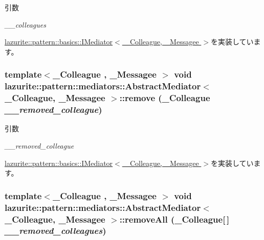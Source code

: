 \begin{DoxyParams}{引数}
\item[{\em \_\-\_\-colleagues}]\end{DoxyParams}


\hyperlink{interfacelazurite_1_1pattern_1_1basics_1_1_i_mediator_3_01___colleague_00_01___messagee_01_4_a60acf7d5d011dd442fc651b2bfb49081}{lazurite::pattern::basics::IMediator$<$ \_\-Colleague, \_\-Messagee $>$}を実装しています。\hypertarget{classlazurite_1_1pattern_1_1mediators_1_1_abstract_mediator_3_01___colleague_00_01___messagee_01_4_ab96e1fc164c5681a0ef3d950434c69e7}{
\subsubsection[{remove}]{\setlength{\rightskip}{0pt plus 5cm}template$<$\_\-Colleague , \_\-Messagee $>$ void lazurite::pattern::mediators::AbstractMediator$<$ \_\-Colleague, \_\-Messagee $>$::remove (\_\-Colleague {\em \_\-\_\-removed\_\-colleague})}}
\label{classlazurite_1_1pattern_1_1mediators_1_1_abstract_mediator_3_01___colleague_00_01___messagee_01_4_ab96e1fc164c5681a0ef3d950434c69e7}

\begin{DoxyParams}{引数}
\item[{\em \_\-\_\-removed\_\-colleague}]\end{DoxyParams}


\hyperlink{interfacelazurite_1_1pattern_1_1basics_1_1_i_mediator_3_01___colleague_00_01___messagee_01_4_a867d7d49b3bb27af92b9ae425a09f956}{lazurite::pattern::basics::IMediator$<$ \_\-Colleague, \_\-Messagee $>$}を実装しています。\hypertarget{classlazurite_1_1pattern_1_1mediators_1_1_abstract_mediator_3_01___colleague_00_01___messagee_01_4_acbc1ecdf4cc271a5793a7631bb692741}{
\subsubsection[{removeAll}]{\setlength{\rightskip}{0pt plus 5cm}template$<$\_\-Colleague , \_\-Messagee $>$ void lazurite::pattern::mediators::AbstractMediator$<$ \_\-Colleague, \_\-Messagee $>$::removeAll (\_\-Colleague\mbox{[}$\,$\mbox{]} {\em \_\-\_\-removed\_\-colleagues})}}
\label{classlazurite_1_1pattern_1_1mediators_1_1_abstract_mediator_3_01___colleague_00_01___messagee_01_4_acbc1ecdf4cc271a5793a7631bb692741}

